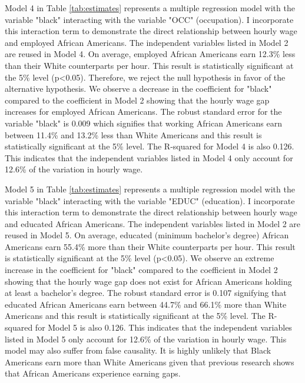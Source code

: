 \documentclass[12pt, english]{article}
\begin{document}
Model 4 in Table \ref{tab:estimates} represents a multiple regression model with the variable "black" interacting with the variable "OCC" (occupation). I incorporate this interaction term to demonstrate the direct relationship between hourly wage and employed African Americans. The independent variables listed in Model 2 are reused in Model 4. On average, employed African Americans earn 12.3\% less than their White counterparts per hour. This result is statistically significant at the 5\% level (p\textless0.05). Therefore, we reject the null hypothesis in favor of the alternative hypothesis. We observe a decrease in the coefficient for "black" compared to the coefficient in Model 2 showing that the hourly wage gap increases for employed African Americans. The robust standard error for the variable "black" is 0.009 which signifies that working African Americans earn between 11.4\% and 13.2\% less than White Americans and this result is statistically significant at the 5\% level. The R-squared for Model 4 is also 0.126. This indicates that the independent variables listed in Model 4 only account for 12.6\% of the variation in hourly wage.

Model 5 in Table \ref{tab:estimates} represents a multiple regression model with the variable "black" interacting with the variable "EDUC" (education). I incorporate this interaction term to demonstrate the direct relationship between hourly wage and educated African Americans. The independent variables listed in Model 2 are reused in Model 5. On average, educated (minimum bachelor's degree) African Americans earn 55.4\% more than their White counterparts per hour. This result is statistically significant at the 5\% level (p\textless0.05). We observe an extreme increase in the coefficient for "black" compared to the coefficient in Model 2 showing that the hourly wage gap does not exist for African Americans holding at least a bachelor's degree. The robust standard error is 0.107 signifying that educated African Americans earn between 44.7\% and 66.1\% more than White Americans and this result is statistically significant at the 5\% level. The R-squared for Model 5 is also 0.126. This indicates that the independent variables listed in Model 5 only account for 12.6\% of the variation in hourly wage. This model may also suffer from false causality. It is highly unlikely that Black Americans earn more than White Americans given that previous research shows that African Americans experience earning gaps. 
\end{document}

